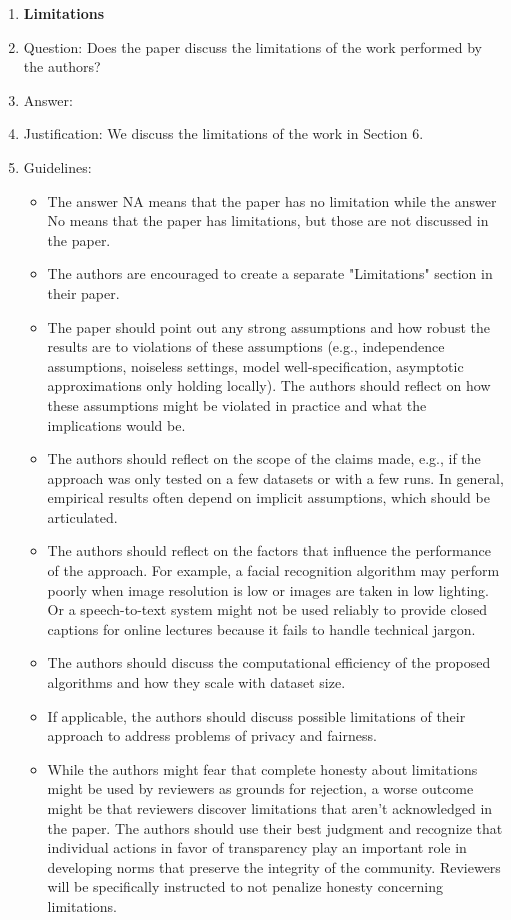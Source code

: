 \documentclass{article}
\theoremstyle{definition}
\begin{document}
\begin{enumerate}
\item {\bf Limitations}
    \item[] Question: Does the paper discuss the limitations of the work performed by the authors?
    \item[] Answer: \answerYes{} %
    \item[] Justification: We discuss the limitations of the work in Section 6.
    \item[] Guidelines:
    \begin{itemize}
        \item The answer NA means that the paper has no limitation while the answer No means that the paper has limitations, but those are not discussed in the paper. 
        \item The authors are encouraged to create a separate "Limitations" section in their paper.
        \item The paper should point out any strong assumptions and how robust the results are to violations of these assumptions (e.g., independence assumptions, noiseless settings, model well-specification, asymptotic approximations only holding locally). The authors should reflect on how these assumptions might be violated in practice and what the implications would be.
        \item The authors should reflect on the scope of the claims made, e.g., if the approach was only tested on a few datasets or with a few runs. In general, empirical results often depend on implicit assumptions, which should be articulated.
        \item The authors should reflect on the factors that influence the performance of the approach. For example, a facial recognition algorithm may perform poorly when image resolution is low or images are taken in low lighting. Or a speech-to-text system might not be used reliably to provide closed captions for online lectures because it fails to handle technical jargon.
        \item The authors should discuss the computational efficiency of the proposed algorithms and how they scale with dataset size.
        \item If applicable, the authors should discuss possible limitations of their approach to address problems of privacy and fairness.
        \item While the authors might fear that complete honesty about limitations might be used by reviewers as grounds for rejection, a worse outcome might be that reviewers discover limitations that aren't acknowledged in the paper. The authors should use their best judgment and recognize that individual actions in favor of transparency play an important role in developing norms that preserve the integrity of the community. Reviewers will be specifically instructed to not penalize honesty concerning limitations.
    \end{itemize}


\end{enumerate}
\end{document}
